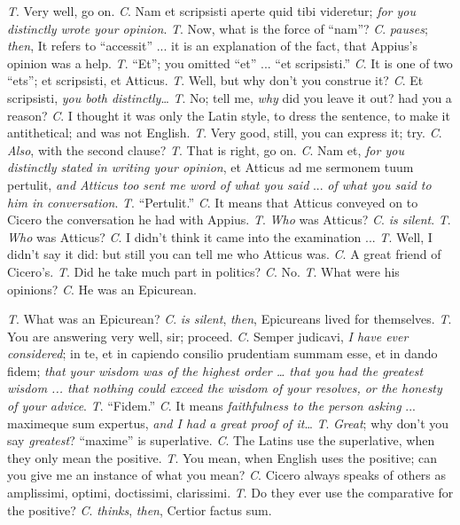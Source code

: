 \emph{T}. Very well, go on. \emph{C}. Nam et scripsisti aperte quid
tibi videretur; \emph{for you distinctly wrote your opinion}.
\emph{T}. Now, what is the force of ``nam''? \emph{C}. \emph{pauses};
\emph{then}, It refers to ``accessit'' ... it is an
explanation of the fact, that Appius's opinion was a help.
\emph{T}. ``Et''; you omitted ``et'' ... ``et
scripsisti.'' \emph{C}. It is one of two ``ets''; et
scripsisti, et Atticus.
\emph{T}. Well, but why don't you construe it? \emph{C}. Et scripsisti,
\emph{you both distinctly}…
\emph{T}. No; tell me, \emph{why} did you leave it out? had you a
reason? \emph{C}. I thought it was only the Latin style, to dress the
sentence, to make it antithetical; and was not English.
\emph{T}. Very good, still, you can express it; try. \emph{C}. \emph{Also},
with the second clause?
\emph{T}. That is right, go on. \emph{C}. Nam et, \emph{for you
distinctly stated in writing your opinion}, et Atticus ad me
sermonem tuum pertulit, \emph{and Atticus too sent me word of what you
said} ... \emph{of what you said to him in conversation}.
\emph{T}. ``Pertulit.'' \emph{C}. It means that Atticus
conveyed on to Cicero the conversation he had with Appius.
\emph{T}. \emph{Who} was Atticus? \emph{C}. \emph{is silent}.
\emph{T}. \emph{Who} was Atticus? \emph{C}. I didn't think it came
into the examination ...
\emph{T}. Well, I didn't say it did: but still you can tell me who
Atticus was. \emph{C}. A great friend of Cicero's.
\emph{T}. Did he take much part in politics? \emph{C}. No.
\emph{T}. What were his opinions? \emph{C}. He was an Epicurean.

\emph{T}. What was an Epicurean? \emph{C}. \emph{is silent}, \emph{then},
Epicureans lived for themselves.
\emph{T}. You are answering very well, sir; proceed. \emph{C}. Semper
judicavi, \emph{I have ever considered}; in te, et in capiendo
consilio prudentiam summam esse, et in dando fidem; \emph{that your
wisdom was of the highest order … that you had the greatest wisdom
... that nothing could exceed the wisdom of your resolves, or the
honesty of your advice}.
\emph{T}. ``Fidem.'' \emph{C}. It means \emph{faithfulness to the
person asking} ... maximeque sum expertus, \emph{and I had a great
proof of it}…
\emph{T}. \emph{Great}; why don't you say \emph{greatest}? ``maxime''
is superlative. \emph{C}. The Latins use the superlative, when they
only mean the positive.
\emph{T}. You mean, when English uses the positive; can you give me an
instance of what you mean? \emph{C}. Cicero always speaks of others as
amplissimi, optimi, doctissimi, clarissimi.
\emph{T}. Do they ever use the comparative for the positive? \emph{C}.
\emph{thinks}, \emph{then}, Certior factus sum.


